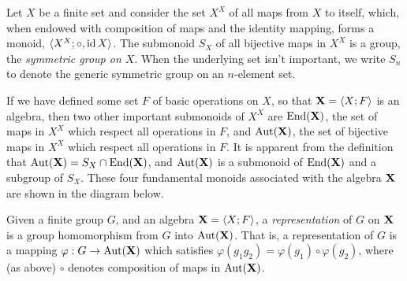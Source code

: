 Let $X$ be a finite set and consider the set $X^X$ of all maps from $X$ to
itself, which, when endowed with composition of maps and the identity mapping,
forms a monoid, $\langle X^X; \circ, \operatorname{id}{X}\rangle$.  The submonoid $S_X$ of all bijective
maps in $X^X$ is a group, the \emph{symmetric group on $X$}.  When the
underlying set isn't important, we write $S_n$ to denote the generic
symmetric group on an $n$-element set. 

If we have defined some set $F$ of basic operations on $X$, so that
$\mathbf{X} = \langle X; F\rangle$ is an algebra, then two other important submonoids of
$X^X$ are $\operatorname{End}(\mathbf{X})$, the set of maps in $X^X$ which respect all 
operations in $F$, and $\operatorname{Aut}(\mathbf{X})$, the set of bijective maps in  $X^X$ which
respect all operations in $F$.  It is apparent from the definition that
 $\operatorname{Aut}(\mathbf{X})= S_X \cap \operatorname{End}(\mathbf{X})$, and  $\operatorname{Aut}(\mathbf{X})$ is a submonoid of $\operatorname{End}(\mathbf{X})$
 and a subgroup of $S_X$.  These four fundamental monoids
 associated with the algebra $\mathbf{X}$ are shown in the diagram below. 

\begin{center}
\end{center}


Given a finite group $G$, and an algebra $\mathbf{X} = \langle X; F\rangle$, a
\emph{representation} of $G$ on $\mathbf{X}$ is a group homomorphism
from $G$ into $\operatorname{Aut}(\mathbf{X})$.  That is, a representation of $G$ is a mapping
$\varphi : G \rightarrow \operatorname{Aut}(\mathbf{X})$ which satisfies $\varphi(g_1 g_2) =
\varphi(g_1) \circ \varphi(g_2)$, where (as above) $\circ$ denotes composition
of maps in $\operatorname{Aut}(\mathbf{X})$.

